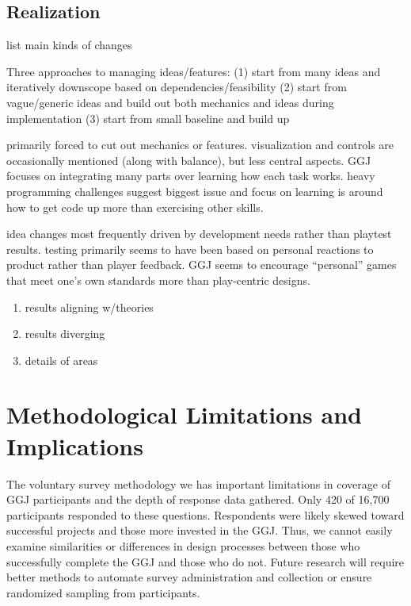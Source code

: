\documentclass{sig-alternate}
\begin{document}
\subsection{Realization}


list main kinds of changes

Three approaches to managing ideas/features: 
(1) start from many ideas and iteratively downscope based on dependencies/feasibility
(2) start from vague/generic ideas and build out both mechanics and ideas during implementation
(3) start from small baseline and build up

primarily forced to cut out mechanics or features. visualization and controls are occasionally mentioned (along with balance), but less central aspects. GGJ focuses on integrating many parts over learning how each task works. heavy programming challenges suggest biggest issue and focus on learning is around how to get code up more than exercising other skills.

idea changes most frequently driven by development needs rather than playtest results. testing primarily seems to have been based on personal reactions to product rather than player feedback. GGJ seems to encourage ``personal'' games that meet one's own standards more than play-centric designs. 

\begin{enumerate}
\item results aligning w/theories
\item results diverging
\item details of areas
\end{enumerate}

\section{Methodological Limitations and Implications}
The voluntary survey methodology we has important limitations in coverage of GGJ participants and the depth of response data gathered. Only 420 of 16,700 participants responded to these questions. Respondents were likely skewed toward successful projects and those more invested in the GGJ. Thus, we cannot easily examine similarities or differences in design processes between those who successfully complete the GGJ and those who do not. Future research will require better methods to automate survey administration and collection or ensure randomized sampling from participants.
\end{document}
